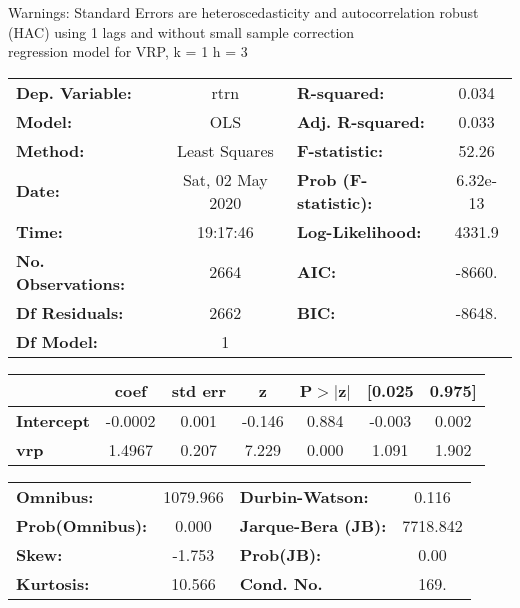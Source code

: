Warnings: \newline
 [1] Standard Errors are heteroscedasticity and autocorrelation robust (HAC) using 1 lags and without small sample correction\\ 

regression model for VRP, k = 1 h = 3\begin{center}
\begin{tabular}{lclc}
\toprule
\textbf{Dep. Variable:}    &       rtrn       & \textbf{  R-squared:         } &     0.034   \\
\textbf{Model:}            &       OLS        & \textbf{  Adj. R-squared:    } &     0.033   \\
\textbf{Method:}           &  Least Squares   & \textbf{  F-statistic:       } &     52.26   \\
\textbf{Date:}             & Sat, 02 May 2020 & \textbf{  Prob (F-statistic):} &  6.32e-13   \\
\textbf{Time:}             &     19:17:46     & \textbf{  Log-Likelihood:    } &    4331.9   \\
\textbf{No. Observations:} &        2664      & \textbf{  AIC:               } &    -8660.   \\
\textbf{Df Residuals:}     &        2662      & \textbf{  BIC:               } &    -8648.   \\
\textbf{Df Model:}         &           1      & \textbf{                     } &             \\
\bottomrule
\end{tabular}
\begin{tabular}{lcccccc}
                   & \textbf{coef} & \textbf{std err} & \textbf{z} & \textbf{P$> |$z$|$} & \textbf{[0.025} & \textbf{0.975]}  \\
\midrule
\textbf{Intercept} &      -0.0002  &        0.001     &    -0.146  &         0.884        &       -0.003    &        0.002     \\
\textbf{vrp}       &       1.4967  &        0.207     &     7.229  &         0.000        &        1.091    &        1.902     \\
\bottomrule
\end{tabular}
\begin{tabular}{lclc}
\textbf{Omnibus:}       & 1079.966 & \textbf{  Durbin-Watson:     } &    0.116  \\
\textbf{Prob(Omnibus):} &   0.000  & \textbf{  Jarque-Bera (JB):  } & 7718.842  \\
\textbf{Skew:}          &  -1.753  & \textbf{  Prob(JB):          } &     0.00  \\
\textbf{Kurtosis:}      &  10.566  & \textbf{  Cond. No.          } &     169.  \\
\bottomrule
\end{tabular}
\end{center}

